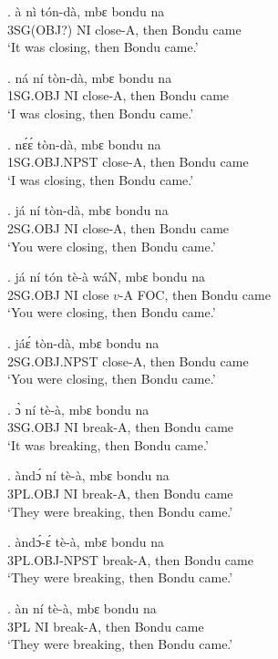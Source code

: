 \documentclass{assets/fieldnotes}
\begin{document}
\exg.
à           nì   tón-dà,    mbɛ    bondu   na   \\
3SG(OBJ?)   NI   close-A,   then   Bondu   came \\%
`It was closing, then Bondu came.'

\exg.
ná        ní   tòn-dà,    mbɛ    bondu   na   \\
1SG.OBJ   NI   close-A,   then   Bondu   came \\%
`I was closing, then Bondu came.'

\exg.
nɛ́ɛ́            tòn-dà,    mbɛ    bondu   na   \\
1SG.OBJ.NPST   close-A,   then   Bondu   came \\%
`I was closing, then Bondu came.'

\exg.
já        ní   tòn-dà,    mbɛ    bondu   na   \\
2SG.OBJ   NI   close-A,   then   Bondu   came \\%
`You were closing, then Bondu came.'

\exg.
já        ní   tón     tè-à    wáN,   mbɛ    bondu   na   \\
2SG.OBJ   NI   close   $v$-A   FOC,   then   Bondu   came \\%
`You were closing, then Bondu came.'

\exg.
jáɛ́            tòn-dà,    mbɛ    bondu   na   \\
2SG.OBJ.NPST   close-A,   then   Bondu   came \\%
`You were closing, then Bondu came.'

\exg.
ɔ̀         ní   tè-à,      mbɛ    bondu   na   \\
3SG.OBJ   NI   break-A,   then   Bondu   came \\%
`It was breaking, then Bondu came.'

\exg.
àndɔ́      ní   tè-à,      mbɛ    bondu   na   \\
3PL.OBJ   NI   break-A,   then   Bondu   came \\%
`They were breaking, then Bondu came.' \label{33574}

\exg.
àndɔ́-ɛ́         tè-à,      mbɛ    bondu   na   \\
3PL.OBJ-NPST   break-A,   then   Bondu   came \\%
`They were breaking, then Bondu came.' \label{39200}

\exg.
àn    ní   tè-à,      mbɛ    bondu   na   \\
3PL   NI   break-A,   then   Bondu   came \\%
`They were breaking, then Bondu came.' \label{58506}
\end{document}

